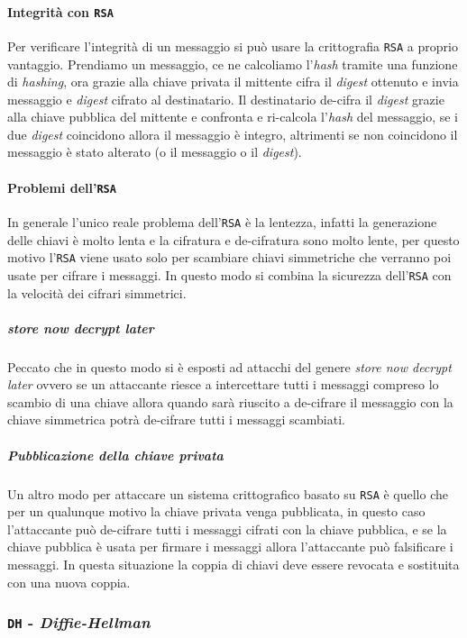             \paragraph{Integrità con \texttt{RSA}}
                Per verificare l'integrità di un messaggio si può usare la crittografia \texttt{RSA} a proprio vantaggio. Prendiamo un messaggio, ce ne calcoliamo l'\textit{hash} tramite una funzione di \textit{hashing}, ora grazie alla chiave privata il mittente cifra il \textit{digest} ottenuto e invia messaggio e \textit{digest} cifrato al destinatario. Il destinatario de-cifra il \textit{digest} grazie alla chiave pubblica del mittente e confronta e ri-calcola l'\textit{hash} del messaggio, se i due \textit{digest} coincidono allora il messaggio è integro, altrimenti se non coincidono il messaggio è stato alterato (o il messaggio o il \textit{digest}).
            \paragraph{Problemi dell'\texttt{RSA}} In generale l'unico reale problema dell'\texttt{RSA} è la lentezza, infatti la generazione delle chiavi è molto lenta e la cifratura e de-cifratura sono molto lente, per questo motivo l'\texttt{RSA} viene usato solo per scambiare chiavi simmetriche che verranno poi usate per cifrare i messaggi. In questo modo si combina la sicurezza dell'\texttt{RSA} con la velocità dei cifrari simmetrici.
                \subparagraph{\textit{store now decrypt later}} Peccato che in questo modo si è esposti ad attacchi del genere \textit{store now decrypt later} ovvero se un attaccante riesce a intercettare tutti i messaggi compreso lo scambio di una chiave allora quando sarà riuscito a de-cifrare il messaggio con la chiave simmetrica potrà de-cifrare tutti i messaggi scambiati.
                \subparagraph{Pubblicazione della chiave privata} Un altro modo per attaccare un sistema crittografico basato su \texttt{RSA} è quello che per un qualunque motivo la chiave privata venga pubblicata, in questo caso l'attaccante può de-cifrare tutti i messaggi cifrati con la chiave pubblica, e se la chiave pubblica è usata per firmare i messaggi allora l'attaccante può falsificare i messaggi. In questa situazione la coppia di chiavi deve essere revocata e sostituita con una nuova coppia.

            \subsubsection{\texttt{DH} - \textit{Diffie-Hellman}}
            